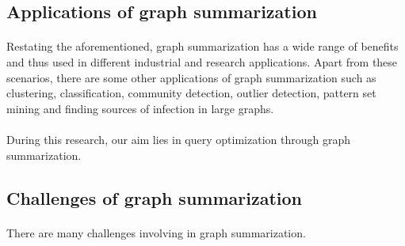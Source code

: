 \subsection{Applications of graph summarization}

\paragraph{}
Restating the aforementioned, graph summarization has a wide range of benefits and thus used in different industrial and research applications. Apart from these scenarios, there are some other applications of graph summarization such as clustering\cite{cilibrasi_clustering_2005}, classification\cite{hutchison_compression_2006}, community detection\cite{chakrabarti_fully_nodate}, outlier detection\cite{smets_odd_2011, akoglu_opavion_2012}, pattern set mining\cite{mampaey_tell_2011} and finding sources of infection in large graphs\cite{prakash_spotting_2012}.

\paragraph{}
During this research, our aim lies in query optimization through graph summarization.

\subsection{Challenges of graph summarization}

\paragraph{}
There are many challenges involving in graph summarization\cite{liu_graph_2018}.

